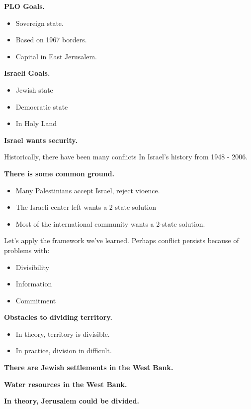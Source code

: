 \documentclass{article}
\begin{document}
{\bf PLO Goals.}

\begin{itemize}
  \item Sovereign state.
  \item Based on 1967 borders.
  \item Capital in East Jerusalem.
\end{itemize}

{\bf Israeli Goals.}

\begin{itemize}
  \item Jewish state
  \item Democratic state
  \item In Holy Land
\end{itemize}

{\bf Israel wants security.}

Historically, there have been many conflicts In Israel's history from 1948 - 2006.

{\bf There is some common ground.}

\begin{itemize}
  \item Many Palestinians accept Israel, reject vioence.
  \item The Israeli center-left wants a 2-state solution
  \item Most of the international community wants a 2-state solution.
\end{itemize}

Let's apply the framework we've learned.  Perhaps conflict persists because of problems with:

\begin{itemize}
  \item Divisibility
  \item Information
  \item Commitment
\end{itemize}

{\bf Obstacles to dividing territory.}

\begin{itemize}
  \item In theory, territory is divisible.
  \item In practice, division in difficult.
\end{itemize}

{\bf There are Jewish settlements in the West Bank.}

{\bf Water resources in the West Bank.}

{\bf In theory, Jerusalem could be divided.}
\end{document}

